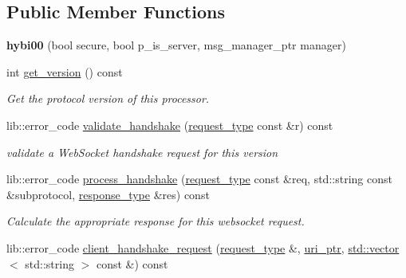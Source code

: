 \subsection*{Public Member Functions}
\begin{DoxyCompactItemize}
\item 
\mbox{\label{classwebsocketpp_1_1processor_1_1hybi00_ac9e56c69bfab35accfa60867d49c90f5}} 
{\bfseries hybi00} (bool secure, bool p\+\_\+is\+\_\+server, msg\+\_\+manager\+\_\+ptr manager)
\item 
\mbox{\label{classwebsocketpp_1_1processor_1_1hybi00_a9e3f451bd48b1072a377108eba0cf0f5}} 
int \mbox{\hyperlink{classwebsocketpp_1_1processor_1_1hybi00_a9e3f451bd48b1072a377108eba0cf0f5}{get\+\_\+version}} () const
\begin{DoxyCompactList}\small\item\em Get the protocol version of this processor. \end{DoxyCompactList}\item 
lib\+::error\+\_\+code \mbox{\hyperlink{classwebsocketpp_1_1processor_1_1hybi00_a9458e35fabf2b39bd9e09523ad60c22c}{validate\+\_\+handshake}} (\mbox{\hyperlink{classwebsocketpp_1_1http_1_1parser_1_1request}{request\+\_\+type}} const \&r) const
\begin{DoxyCompactList}\small\item\em validate a Web\+Socket handshake request for this version \end{DoxyCompactList}\item 
lib\+::error\+\_\+code \mbox{\hyperlink{classwebsocketpp_1_1processor_1_1hybi00_a29c4300aa053e7028ee5a46601319afd}{process\+\_\+handshake}} (\mbox{\hyperlink{classwebsocketpp_1_1http_1_1parser_1_1request}{request\+\_\+type}} const \&req, std\+::string const \&subprotocol, \mbox{\hyperlink{classwebsocketpp_1_1http_1_1parser_1_1response}{response\+\_\+type}} \&res) const
\begin{DoxyCompactList}\small\item\em Calculate the appropriate response for this websocket request. \end{DoxyCompactList}\item 
lib\+::error\+\_\+code \mbox{\hyperlink{classwebsocketpp_1_1processor_1_1hybi00_a5f88e94fc52da9be8ba718889b5c093f}{client\+\_\+handshake\+\_\+request}} (\mbox{\hyperlink{classwebsocketpp_1_1http_1_1parser_1_1request}{request\+\_\+type}} \&, \mbox{\hyperlink{namespacewebsocketpp_aae370ea5ac83a8ece7712cb39fc23f5b}{uri\+\_\+ptr}}, \mbox{\hyperlink{classstd_1_1vector}{std\+::vector}}$<$ std\+::string $>$ const \&) const

\end{DoxyCompactItemize}
